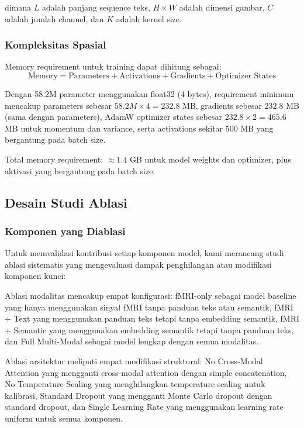 dimana $L$ adalah panjang sequence teks, $H \times W$ adalah dimensi gambar, $C$ adalah jumlah channel, dan $K$ adalah kernel size.

\subsubsection{Kompleksitas Spasial}
Memory requirement untuk training dapat dihitung sebagai:
\begin{equation}
\text{Memory} = \text{Parameters} + \text{Activations} + \text{Gradients} + \text{Optimizer States}
\label{eq:memory_requirement}
\end{equation}

Dengan 58.2M parameter menggunakan float32 (4 bytes), requirement minimum mencakup parameters sebesar $58.2M \times 4 = 232.8$ MB, gradients sebesar $232.8$ MB (sama dengan parameters), AdamW optimizer states sebesar $232.8 \times 2 = 465.6$ MB untuk momentum dan variance, serta activations sekitar $500$ MB yang bergantung pada batch size.

Total memory requirement: $\approx 1.4$ GB untuk model weights dan optimizer, plus aktivasi yang bergantung pada batch size.

\subsection{Desain Studi Ablasi}

\subsubsection{Komponen yang Diablasi}
Untuk memvalidasi kontribusi setiap komponen model, kami merancang studi ablasi sistematis yang mengevaluasi dampak penghilangan atau modifikasi komponen kunci:

Ablasi modalitas mencakup empat konfigurasi: fMRI-only sebagai model baseline yang hanya menggunakan sinyal fMRI tanpa panduan teks atau semantik, fMRI + Text yang menggunakan panduan teks tetapi tanpa embedding semantik, fMRI + Semantic yang menggunakan embedding semantik tetapi tanpa panduan teks, dan Full Multi-Modal sebagai model lengkap dengan semua modalitas.

Ablasi arsitektur meliputi empat modifikasi struktural: No Cross-Modal Attention yang mengganti cross-modal attention dengan simple concatenation, No Temperature Scaling yang menghilangkan temperature scaling untuk kalibrasi, Standard Dropout yang mengganti Monte Carlo dropout dengan standard dropout, dan Single Learning Rate yang menggunakan learning rate uniform untuk semua komponen.

